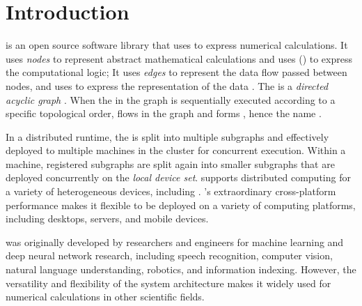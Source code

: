 \begin{savequote}[45mm]
\end{savequote}


\chapter{Introduction} 
\label{ch:introduction}

\begin{content}
\tf{} is an open source software library that uses  to express numerical calculations. It uses \emph{nodes} to represent abstract mathematical calculations and uses  () to express the computational logic; It uses \emph{edges} to represent the data flow passed between nodes, and uses  to express the representation of the data . The   is a \emph{directed acyclic graph} . When the  in the graph is sequentially executed according to a specific topological order,  flows in the graph and forms , hence the name \tf{}.

In a distributed runtime, the  is split into multiple subgraphs and effectively deployed to multiple machines in the cluster for concurrent execution. Within a machine, registered subgraphs are split again into smaller subgraphs that are deployed concurrently on the \emph{local device set}. \tf{} supports distributed computing for a variety of heterogeneous devices, including  . \tf{}'s extraordinary cross-platform performance makes it flexible to be deployed on a variety of computing platforms, including desktops, servers, and mobile devices.

\tf{} was originally developed by  researchers and engineers for machine learning and deep neural network research, including speech recognition, computer vision, natural  language understanding, robotics, and information indexing. However, the versatility and flexibility of the \tf{} system architecture makes it widely used for numerical calculations in other  scientific fields.
\end{content}


